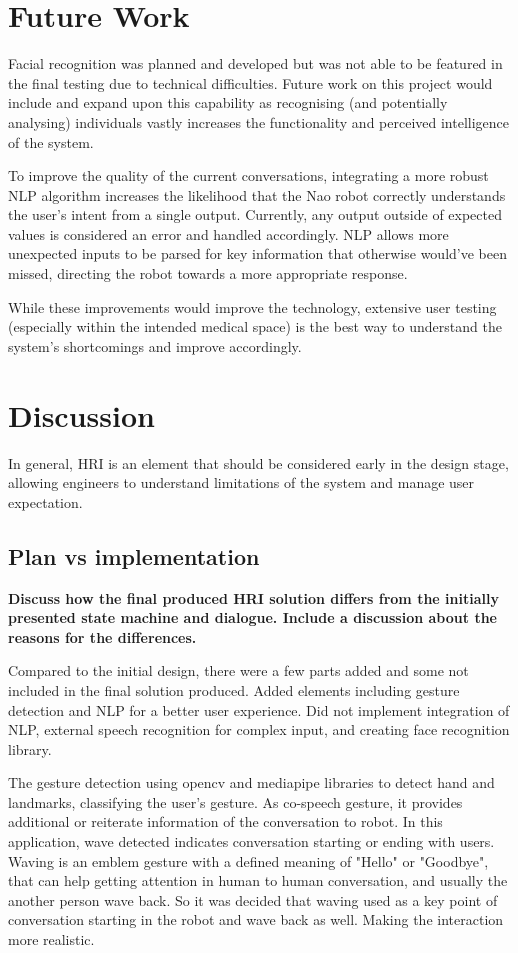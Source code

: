 \documentclass[conference]{IEEEtran}
\begin{document}
\section{Future Work}Facial recognition was planned and developed but was not able to be featured in the final testing due to 
technical difficulties. Future work on this project would include and expand upon this capability as recognising (and potentially 
analysing) individuals vastly increases the functionality and perceived intelligence of the system.

To improve the quality of the current conversations, integrating a more robust NLP algorithm increases the likelihood that the Nao 
robot correctly understands the user’s intent from a single output. Currently, any output outside of expected values is considered 
an error and handled accordingly. NLP allows more unexpected inputs to be parsed for key information that otherwise would’ve been 
missed, directing the robot towards a more appropriate response.

While these improvements would improve the technology, extensive user testing (especially within the intended medical space) is the 
best way to understand the system's shortcomings and improve accordingly.


\section{Discussion}
In general, HRI is an element that should be considered early in the design stage, allowing engineers to understand limitations of the system and manage user expectation.
\subsection{Plan vs implementation}
\textbf{Discuss how the final produced HRI solution differs from the initially presented state machine and dialogue. Include a discussion about the reasons for the differences.}

Compared to the initial design, there were a few parts added and some not included in the final solution produced. Added elements including gesture detection and NLP for a better user experience. Did not implement integration of NLP, external speech recognition for complex input, and creating face recognition library.

The gesture detection using opencv and mediapipe libraries to detect hand and landmarks, classifying the user's gesture. As co-speech gesture, it provides additional or reiterate information of the conversation to robot. In this application, wave detected indicates conversation starting or ending with users. Waving is an emblem gesture with a defined meaning of "Hello" or "Goodbye", that can help getting attention in human to human conversation, and usually the another person wave back. So it was decided that waving used as a key point of conversation starting in the robot and wave back as well. Making the interaction more realistic.
\end{document}
